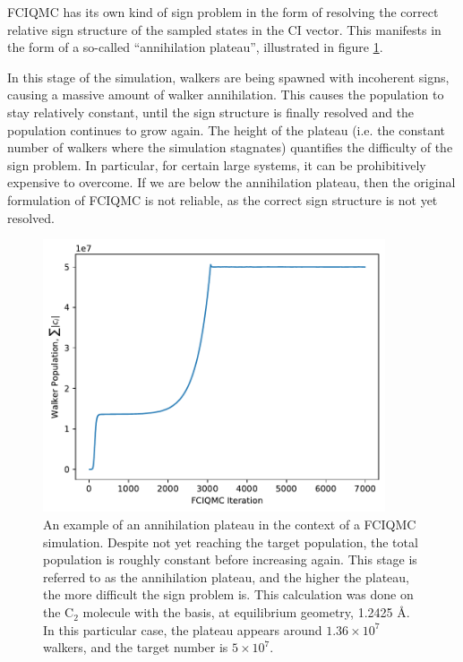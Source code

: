 \gls{FCIQMC} has its own kind of sign problem in the form of resolving the correct relative sign structure of the sampled states in the \gls{CI} vector.\supercite{spencerSign2012} This manifests in the form of a so-called ``annihilation plateau'', illustrated in figure \ref{fig:annihilation_plateau}.

In this stage of the simulation, walkers are being spawned with incoherent signs, causing a massive amount of walker annihilation. This causes the population to stay relatively constant, until the sign structure is finally resolved and the population continues to grow again. The height of the plateau (i.e. the constant number of walkers where the simulation stagnates) quantifies the difficulty of the sign problem. In particular, for certain large systems, it can be prohibitively expensive to overcome. If we are below the annihilation plateau, then the original formulation of \gls{FCIQMC} is not reliable, as the correct sign structure is not yet resolved.

\begin{figure}[htbp]
    \centering
    \includegraphics[width=0.9\textwidth]{figures/qmc/c2_example_plateau.pdf}
    \caption{An example of an annihilation plateau in the context of a \gls{FCIQMC} simulation. Despite not yet reaching the target population, the total population is roughly constant before increasing again. This stage is referred to as the annihilation plateau, and the higher the plateau, the more difficult the sign problem is. This calculation was done on the C$_2$ molecule with the \vdz basis, at equilibrium geometry, 1.2425 \AA. In this particular case, the plateau appears around $1.36\times 10^7$ walkers, and the target number is $5\times 10^7$.}
    \label{fig:annihilation_plateau}
\end{figure}

